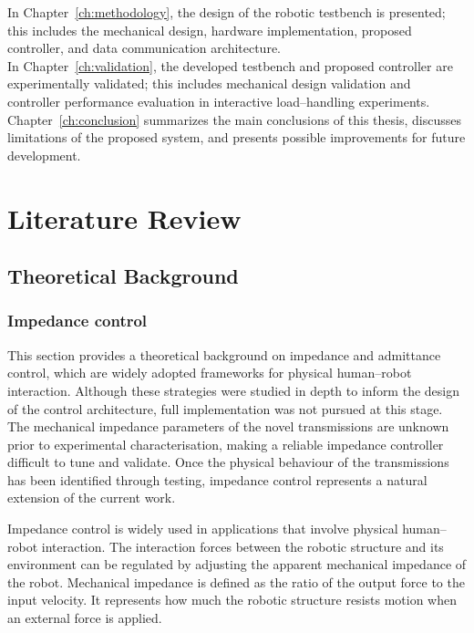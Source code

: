 \documentclass[11pt,a4paper,twoside,openright]{book}
\begin{document}
In Chapter~\ref{ch:methodology}, the design of the robotic testbench is presented; this includes the mechanical design, hardware implementation, proposed controller, and data communication architecture.\\

In Chapter~\ref{ch:validation}, the developed testbench and proposed controller are experimentally validated; this includes mechanical design validation and controller performance evaluation in interactive load--handling experiments.\\

Chapter~\ref{ch:conclusion} summarizes the main conclusions  of this thesis, discusses limitations of the proposed system, and presents possible improvements for future development.
\chapter{Literature Review}
\label{ch:literature}

\section{Theoretical Background}

\subsection{Impedance control}

This section provides a theoretical background on impedance and admittance control, which are widely adopted frameworks for physical human--robot interaction. Although these strategies were studied in depth to inform the design of the control architecture, full implementation was not pursued at this stage. The mechanical impedance parameters of the novel transmissions are unknown prior to experimental characterisation, making a reliable impedance controller difficult to tune and validate. Once the physical behaviour of the transmissions has been identified through testing, impedance control represents a natural extension of the current work.

Impedance control is widely used in applications that involve physical human--robot interaction. The interaction forces between the robotic structure and its environment can be regulated by adjusting the apparent mechanical impedance of the robot. Mechanical impedance is defined as the ratio of the output force to the input velocity. It represents how much the robotic structure resists motion when an external force is applied.
\end{document}
